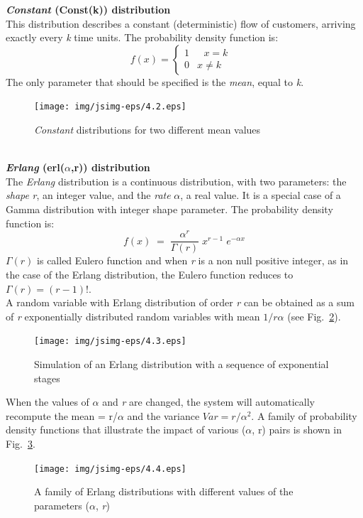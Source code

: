 \textbf{\emph{Constant} (Const(k)) distribution}\\
 This distribution
describes a constant (deterministic) flow of customers, arriving
exactly every \emph{k} time units. The probability density function is:
\[ f(x) = \left\{ \begin{array} {ll}
          1   &   \mbox{ $x=k$ } \\
          0   &   \mbox{$x\neq{k}$}
                 \end {array}
\right.   \] The only parameter that should be specified is the
\emph{mean}, equal to \emph{k}.
\begin{figure}[htb]
    \begin{center}
        \texttt{[image: img/jsimg-eps/4.2.eps]}
    \end{center}
    \caption{\emph{Constant} distributions for two different mean values}
    \label{fig:constk}
\end{figure}\\

\textbf{\emph{Erlang} (erl($\alpha$,r)) distribution}\\
The \emph{Erlang} distribution is a continuous distribution, with
two parameters: the \emph{shape} \emph{r}, an integer value, and the
\emph{rate}
$\alpha$, a real value. It is a special case of a Gamma
distribution with integer shape parameter. The probability density
function is:
\[
f(x)\; = \; \frac{\alpha^r}{\Gamma(r)} \; x^{r-1} \; e^{-\alpha x}
\]
$\Gamma(r)$ is called Eulero function and when \emph{r} is a non
null positive integer, as in the case of the Erlang distribution,
the Eulero function reduces to $\Gamma(r)= (r-1)!$.\\
A random variable with Erlang distribution of order \emph{r} can
be obtained as a sum of \emph{r} exponentially distributed random
variables with mean $1/r \alpha$ (see Fig.~\ref{fig:simErl}).
\begin{figure}[htb]
    \begin{center}
        \texttt{[image: img/jsimg-eps/4.3.eps]}
    \end{center}
    \caption{Simulation of an Erlang distribution with a sequence of exponential stages}
    \label{fig:simErl}
\end{figure}
When the values of $\alpha$ and \emph{r} are changed, the system
will automatically recompute the mean = r/$\alpha$ and the
variance $Var = r/\alpha^2$. A family of probability density
functions that illustrate the impact of various ($\alpha$, r)
pairs is shown in Fig.~\ref{fig:famErl}.
\begin{figure}[htb]
    \begin{center}
        \texttt{[image: img/jsimg-eps/4.4.eps]}
    \end{center}
    \caption{A family of Erlang distributions with different values of the
    parameters ($\alpha$, \emph{r})}
    \label{fig:famErl}
\end{figure}\\


